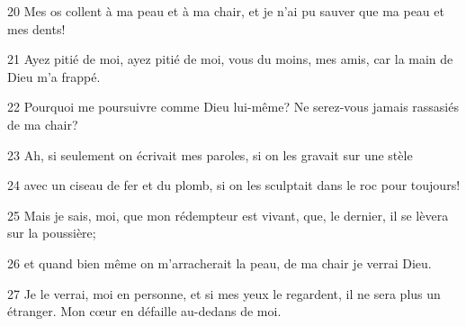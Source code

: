 20 Mes os collent à ma peau et à ma chair, et je n’ai pu sauver que ma peau et mes dents!

21 Ayez pitié de moi, ayez pitié de moi, vous du moins, mes amis, car la main de Dieu m’a frappé.

22 Pourquoi me poursuivre comme Dieu lui-même? Ne serez-vous jamais rassasiés de ma chair?

23 Ah, si seulement on écrivait mes paroles, si on les gravait sur une stèle

24 avec un ciseau de fer et du plomb, si on les sculptait dans le roc pour toujours!

25 Mais je sais, moi, que mon rédempteur est vivant, que, le dernier, il se lèvera sur la poussière;

26 et quand bien même on m’arracherait la peau, de ma chair je verrai Dieu.

27 Je le verrai, moi en personne, et si mes yeux le regardent, il ne sera plus un étranger. Mon cœur en défaille au-dedans de moi.